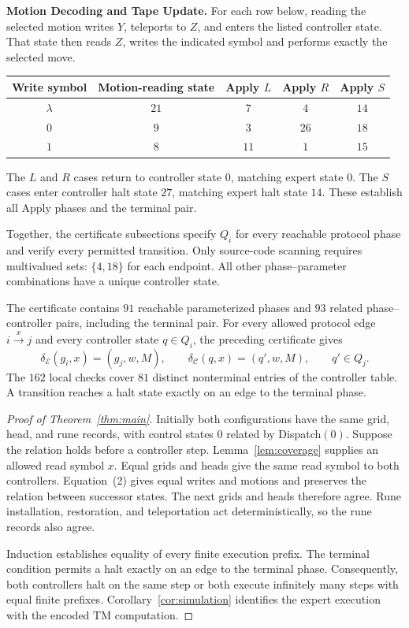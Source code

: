 \documentclass[11pt,a4paper]{article}
\newcommand{\blank}{\lambda}
\newcommand{\EXPERT}{\mathcal E}
\newcommand{\CTRL}{\mathcal C}
\newcommand{\sectiontitle}[2]{\refstepcounter{section}\vspace*{2pt}{\LARGE\bfseries\color{Teal}\thesection\quad #2}\par\vspace{7pt}}
\begin{document}
\textbf{Motion Decoding and Tape Update.}
For each row below, reading the selected motion writes $Y$, teleports to
$Z$, and enters the listed controller state. That state then reads $Z$,
writes the indicated symbol and performs exactly the selected move.
\begin{center}
\small\renewcommand{\arraystretch}{1.32}
\begin{tabular}{c c ccc}
\toprule\rowcolor{Pale}Write symbol & Motion-reading state & Apply $L$ & Apply $R$ & Apply $S$\\\midrule
$\blank$ & $21$ & $7$ & $4$ & $14$\\
$0$ & $9$ & $3$ & $26$ & $18$\\
$1$ & $8$ & $11$ & $1$ & $15$\\
\bottomrule
\end{tabular}
\end{center}
The $L$ and $R$ cases return to controller state $0$, matching expert state
$0$. The $S$ cases enter controller halt state $27$, matching expert halt
state $14$. These establish all Apply phases and the terminal pair.

Together, the certificate subsections specify $Q_i$ for every reachable
protocol phase and verify every permitted transition. Only source-code scanning requires multivalued sets: $\{4,18\}$ for each endpoint.
All other phase--parameter combinations have a unique controller state.

The certificate contains $91$ reachable parameterized phases and $93$ related
phase--controller pairs, including the terminal pair. For every allowed protocol edge $i\xrightarrow{x}j$ and every controller state $q\in Q_i$, the preceding certificate gives
\begin{equation}
\delta_\EXPERT(g_i,x)=(g_j,w,M),\qquad
\delta_\CTRL(q,x)=(q',w,M),\qquad q'\in Q_j. \tag{2}
\end{equation}
The $162$ local checks cover $81$ distinct nonterminal entries of the controller table.
A transition reaches a halt state exactly on an edge to the terminal phase.

\clearpage
\sectiontitle{5 \enspace EQUIVALENCE PROOF}{Equivalence Proof}\label{sec:common5}
\label{sec:equivalence}
\begin{proof}[Proof of Theorem~\ref{thm:main}]
Initially both configurations have the same grid, head, and rune records,
with control states $0$ related by Dispatch$(0)$. Suppose the relation holds
before a controller step. Lemma~\ref{lem:coverage} supplies an allowed read symbol
$x$. Equal grids and heads give the same read symbol to both controllers.
Equation~(2) gives equal writes and motions and preserves the relation
between successor states. The next grids and heads therefore agree.
Rune installation, restoration, and teleportation act deterministically,
so the rune records also agree.

Induction establishes equality of every finite execution prefix. The terminal
condition permits a halt exactly on an edge to the terminal phase.
Consequently, both controllers halt on the same step or both execute
infinitely many steps with equal finite prefixes. Corollary~\ref{cor:simulation}
identifies the expert execution with the encoded TM computation.
\end{proof}
\end{document}

